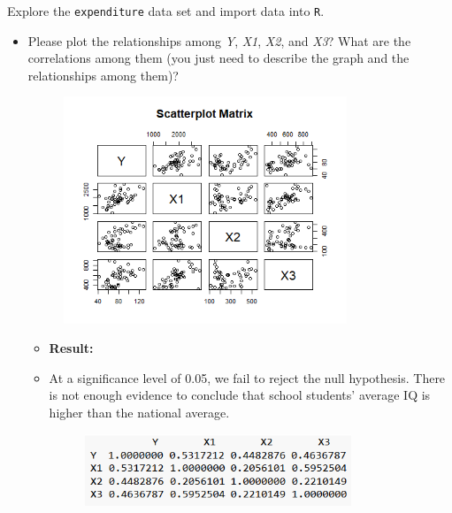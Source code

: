 \documentclass[12pt,letterpaper]{article}
\begin{document}
\vspace{.5cm}
\noindent Explore the \texttt{expenditure} data set and import data into \texttt{R}.
\vspace{.5cm}
  
\vspace{.5cm}
\begin{itemize}

\item
Please plot the relationships among \emph{Y}, \emph{X1}, \emph{X2}, and \emph{X3}? What are the correlations among them (you just need to describe the graph and the relationships among them)?
\vspace{.5cm}
 
\begin{figure}[H]
	\centering
	\includegraphics[width=0.8\textwidth]{1}
\end{figure}
 
		\begin{itemize}
	\item \textbf{Result:}
	\item  At a significance level of 0.05, we fail to reject the null hypothesis. There is not enough evidence to conclude that school students' average IQ is higher than the national average.\\
	\begin{figure}[H]
		\centering
		\includegraphics[width=0.8\textwidth]{2}

\end{figure}
\end{itemize}
\end{itemize}
\end{document}
